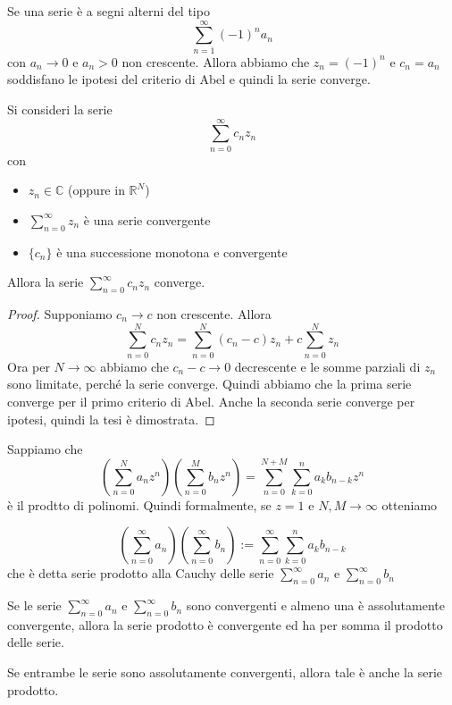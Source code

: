 \begin{corollary}
    Se una serie è a segni alterni del tipo 
    \[
        \sum_{n=1}^{\infty} {(-1)}^{n} a_{n}
    \]
    con \(a_{n} \to 0\) e \(a_{n} > 0\) non crescente. Allora abbiamo che
    \(z_{n} = {(-1)}^{n}\) e \(c_{n} = a_{n}\) soddisfano le ipotesi del
    criterio di Abel e quindi la serie converge.
\end{corollary}
\begin{theorem}
    Si consideri la serie \[
        \sum_{n=0}^{\infty} c_{n} z_{n} 
    \]
    con
    \begin{itemize}
        \item \(z_{n} \in \mathbb{C}\) (oppure in \(\mathbb{R}^{N}\))
        \item \(\sum_{n=0}^{\infty} z_{n}\) è una serie convergente
        \item \(\{c_{n}\}\) è una successione monotona e convergente
    \end{itemize}
    Allora la serie \(\sum_{n=0}^{\infty} c_{n} z_{n}\) converge.
\end{theorem}
\begin{proof}
    Supponiamo \(c_{n} \to c\) non crescente. Allora
    \[
        \sum_{n=0}^{N} c_{n} z_{n} = \sum_{n=0}^{N} (c_{n} - c)z_{n} + c
        \sum_{n=0}^{N} z_{n}
    \]
    Ora per \(N \to \infty\) abbiamo che \(c_{n} - c \to 0\) decrescente e le
    somme parziali di \(z_{n}\) sono limitate, perché la serie converge. Quindi
    abbiamo che la prima serie converge per il primo criterio di Abel. 
    Anche la seconda serie converge per ipotesi, quindi la tesi è dimostrata.
\end{proof}

Sappiamo che 
\[
    \left( \sum_{n=0}^{N} a_{n} z^{n}  \right) \left( \sum_{n=0}^{M}
        b_{n} z^{n}
    \right) = \sum_{n=0}^{N+M} \sum_{k=0}^{n} a_{k} b_{n-k}  z^{n}
\]
è il prodtto di polinomi. Quindi formalmente, se \(z = 1\) e \(N, M \to \infty\) otteniamo

\begin{definition}
\[
    \left( \sum_{n=0}^{\infty} a_{n}  \right) \left( \sum_{n=0}^{\infty} b_{n}
    \right) := \sum_{n=0}^{\infty} \sum_{k=0}^{n} a_{k} b_{n-k}  
\]
che è detta serie prodotto alla Cauchy delle serie \(\sum_{n=0}^{\infty} a_{n}\)
e \(\sum_{n=0}^{\infty} b_{n} \) 
\end{definition}

\begin{theorem}
    Se le serie \(\sum_{n=0}^{\infty} a_{n}\) e \(\sum_{n=0}^{\infty} b_{n} \)
    sono convergenti e almeno una è assolutamente convergente, allora la serie
    prodotto è convergente ed ha per somma il prodotto delle serie.
    
    Se entrambe le serie sono assolutamente convergenti, allora tale è anche la
    serie prodotto.
\end{theorem}

